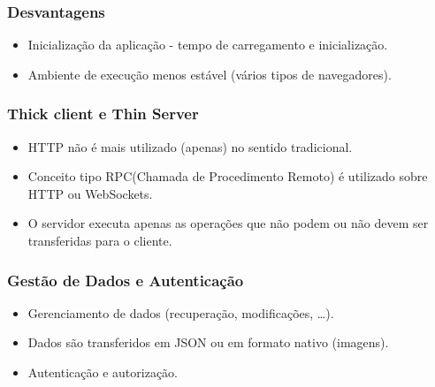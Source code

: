 \documentclass{beamer}
\begin{document}
\begin{frame}
      \frametitle{Desvantagens}
      \begin{itemize}
            \item Inicialização da aplicação - tempo de carregamento e inicialização.
            \item Ambiente de execução menos estável (vários tipos de navegadores).
      \end{itemize}
\end{frame}

\begin{frame}
      \frametitle{Thick client e Thin Server}
      \begin{itemize}
            \item HTTP não é mais utilizado (apenas) no sentido tradicional.
            \item Conceito tipo RPC(Chamada de Procedimento Remoto) é utilizado sobre HTTP ou WebSockets.
            \item O servidor executa apenas as operações que não podem ou não devem ser transferidas para o cliente.
      \end{itemize}
\end{frame}

\begin{frame}
      \frametitle{Gestão de Dados e Autenticação}
      \begin{itemize}
            \item Gerenciamento de dados (recuperação, modificações, …).
            \item Dados são transferidos em JSON ou em formato nativo (imagens).
            \item Autenticação e autorização.
      \end{itemize}
\end{frame}
\end{document}
